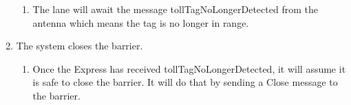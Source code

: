 \begin{enumerate}
\begin{enumerate}
\item The lane will await the message tollTagNoLongerDetected from the antenna
which means the tag is no longer in range.
\end{enumerate}
\item The system closes the barrier.

\begin{enumerate}
\item Once the Express has received tollTagNoLongerDetected, it will assume
it is safe to close the barrier. It will do that by sending a Close
message to the barrier.\end{enumerate}
\end{enumerate}
